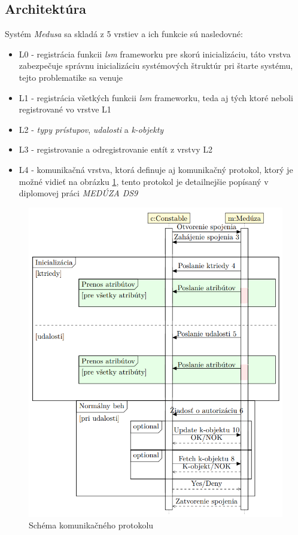 \subsection{Architektúra}
Systém \textit{Medusa} sa skladá z 5 vrstiev a ich funkcie sú nasledovné:
\begin{itemize}
\item L0 - registrácia funkcii \textit{lsm} frameworku pre skorú inicializáciu, táto vrstva zabezpečuje správnu inicializáciu systémových štruktúr pri štarte systému, tejto problematike sa venuje \cite{medusatim}
\item L1 - registrácia všetkých funkcii \textit{lsm} frameworku, teda aj tých ktoré neboli registrované vo vrstve L1
\item L2 - \textit{typy prístupov}, \textit{udalosti} a \textit{k-objekty}
\item L3 - registrovanie a odregistrovanie entít z vrstvy L2
\item L4 - komunikačná vrstva, ktorá definuje aj komunikačný protokol, ktorý je možné vidieť na obrázku \ref{medusakomunikacia}, tento protokol je detailnejšie popísaný v diplomovej práci \textit{MEDÚZA DS9}\cite{kacer}
\end{itemize}
\begin{figure}[!htbp]
  \centering
  \includegraphics[width=12cm]{img/komunikacia.png}
  \caption{Schéma komunikačného protokolu\cite{kacer}}
  \label{medusakomunikacia}
\end{figure}

